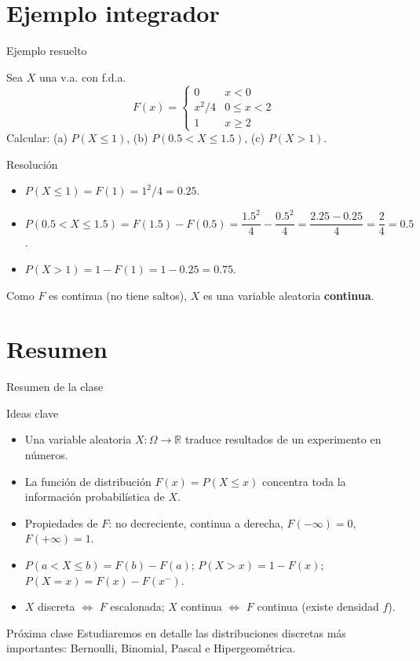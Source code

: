 \documentclass[aspectratio=169,11pt]{beamer}
\begin{document}
\section{Ejemplo integrador}

\begin{frame}{Ejemplo resuelto}
\begin{example}
Sea $X$ una v.a. con f.d.a.
$$F(x) = \begin{cases} 0 & x<0 \\ x^2/4 & 0\le x <2 \\ 1 & x\ge 2\end{cases}$$
Calcular: (a) $P(X\le 1)$, (b) $P(0.5 < X \le 1.5)$, (c) $P(X>1)$.
\end{example}

\begin{block}{Resolución}
\begin{itemize}
\item[(a)] $P(X\le 1) = F(1) = 1^2/4 = 0.25$.
\item[(b)] $P(0.5<X\le 1.5) = F(1.5)-F(0.5) = \dfrac{1.5^2}{4} - \dfrac{0.5^2}{4} = \dfrac{2.25-0.25}{4} = \dfrac{2}{4}=0.5$.
\item[(c)] $P(X>1) = 1-F(1) = 1-0.25 = 0.75$.
\end{itemize}
Como $F$ es continua (no tiene saltos), $X$ es una variable aleatoria \textbf{continua}.
\end{block}
\end{frame}

\section{Resumen}

\begin{frame}{Resumen de la clase}
\begin{block}{Ideas clave}
\begin{itemize}
\item Una variable aleatoria $X:\Omega\to\mathbb{R}$ traduce resultados de un experimento en números.
\item La función de distribución $F(x)=P(X\le x)$ concentra toda la información probabilística de $X$.
\item Propiedades de $F$: no decreciente, continua a derecha, $F(-\infty)=0$, $F(+\infty)=1$.
\item $P(a<X\le b)=F(b)-F(a)$; $P(X>x)=1-F(x)$; $P(X=x)=F(x)-F(x^-)$.
\item $X$ discreta $\Leftrightarrow$ $F$ escalonada; $X$ continua $\Leftrightarrow$ $F$ continua (existe densidad $f$).
\end{itemize}
\end{block}

\begin{alertblock}{Próxima clase}
Estudiaremos en detalle las distribuciones discretas más importantes: Bernoulli, Binomial, Pascal e Hipergeométrica.
\end{alertblock}
\end{frame}
\end{document}
